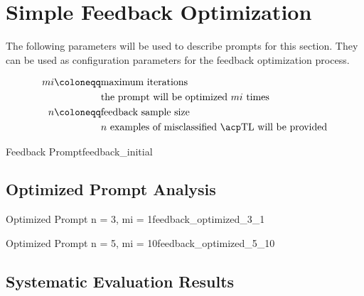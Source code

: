 \newpage


\section{Simple Feedback Optimization}
\label{sec:Evaluation:simple_feedback_optimization}

The following parameters will be used to describe prompts for this section.
They can be used as configuration parameters for the feedback optimization process.

\begin{align*}
    mi\coloneqq  & \text{maximum iterations}\\
    & \text{the prompt will be optimized $mi$ times} \\
    n \coloneqq & \text{feedback sample size}\\
    & \text{$n$ examples of misclassified \TLs will be provided}
\end{align*}

\begin{prompt}{Feedback Prompt}{feedback_initial}
    \\
    
\end{prompt}

\subsection{Optimized Prompt Analysis}
\label{subsec:Evaluation:simple_feedback:optimized-prompt-analysis}

\begin{prompt}{Optimized Prompt n = 3, mi = 1}{feedback_optimized_3_1}
    \\
    
\end{prompt}

\begin{prompt}{Optimized Prompt n = 5, mi = 10}{feedback_optimized_5_10}
    \\
    
\end{prompt}

\subsection{Systematic Evaluation Results}
\label{subsec:Evaluation:simple_feedback_optimization:systematic-evaluation-results}

